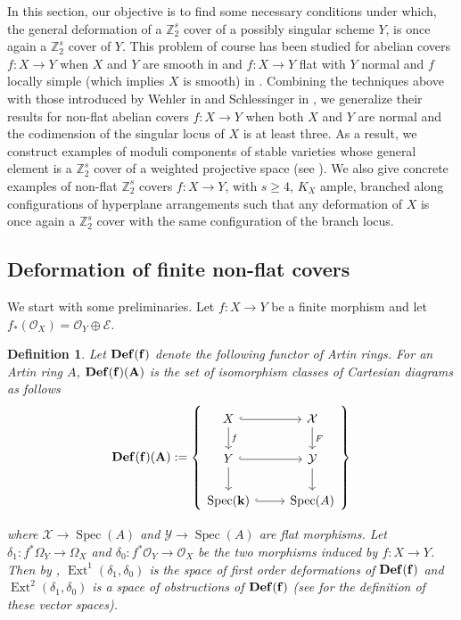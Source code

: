 \documentclass[12pt,twoside,]{amsart}
\theoremstyle{plain}
\newtheorem{definition}[theorem]{Definition}
\theoremstyle{definition}
\begin{document}
In this section, our objective is to find some necessary conditions under which, the general deformation of a $\mathbb{Z}_2^s$ cover of a possibly singular scheme $Y$, is once again a $\mathbb{Z}_2^s$ cover of $Y$. This problem of course has been studied for abelian covers $f: X \to Y$ when $X$ and $Y$ are smooth in \cite{pardini1991abelian} and $f: X \to Y$ flat with $Y$ normal and $f$ locally simple (which implies $X$ is smooth) in \cite{Man95}. Combining the techniques above with those introduced by Wehler in \cite{wehler86deformations} and Schlessinger in \cite{schlessinger1971}, we generalize their results for non-flat abelian covers $f: X \to Y$ when both $X$ and $Y$ are normal and the codimension of the singular locus of $X$ is at least three. As a result, we construct examples of moduli components of stable varieties whose general element is a $\mathbb{Z}_2^s$ cover of a weighted projective space (see ). We also give concrete examples of non-flat $\mathbb{Z}_2^s$ covers $f: X \to Y$, with $s \geq 4$, $K_X$ ample, branched along configurations of hyperplane arrangements such that any deformation of $X$ is once again a $\mathbb{Z}_2^s$ cover with the same configuration of the branch locus. 

\subsection{Deformation of finite non-flat covers}
We start with some preliminaries. Let $f: X \to Y$ be a finite morphism and let $f_*(\mathcal{O}_X) = \mathcal{O}_Y \oplus \mathcal{E}$.

\begin{definition}
    Let $\bf Def(f)$ denote the following functor of Artin rings. For an Artin ring $A$, $\bf Def(f)(A)$ is the set of isomorphism classes of Cartesian diagrams as follows
$$  \bf Def(f)(A) := \left\{ 
    \begin{tikzcd}
     X \arrow[r, hook] \arrow[d, "f"] & \mathcal{X} \arrow[d, "F"] \\
     Y \arrow[r, hook] \arrow[d] & \mathcal{Y} \arrow[d] \\
     \textrm{Spec}(\mathbf{k}) \arrow[r, hook] & \textrm{Spec}(A) 
    \end{tikzcd}
\right\}
$$

where $\mathcal{X} \to \operatorname{Spec}(A)$ and $\mathcal{Y} \to \operatorname{Spec}(A)$ are flat morphisms. Let $\delta_1: f^*\Omega_Y \to \Omega_X$ and $\delta_0: f^*\mathcal{O}_Y \to \mathcal{O}_X$ be the two morphisms induced by $f: X \to Y$. Then by \cite[Proposition $3.1$]{defofmaps89}, $\operatorname{Ext}^1(\delta_1, \delta_0)$ is the space of first order deformations of $\bf Def(f)$ and $\operatorname{Ext}^2(\delta_1, \delta_0)$ is a space of obstructions of $\bf Def(f)$ (see \cite[Section $2$]{defofmaps89} for the definition of these vector spaces).     
\end{definition}
\end{document}
